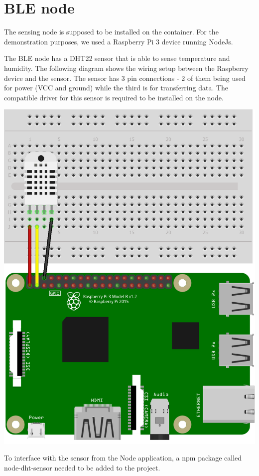 \section {BLE node}
\label {Impl_BLEnodeSection}

The sensing node is supposed to be installed on the container. For the demonstration purposes, we used a Raspberry Pi 3 device running NodeJs.

The BLE node has a DHT22 sensor that is able to sense temperature and humidity. The following diagram shows the wiring setup between the Raspberry device and the sensor. The sensor has 3 pin connections - 2 of them being used for power (VCC and ground) while the third is for transferring data. The compatible driver for this sensor is required to be installed on the node.

\bigskip
\includegraphics[scale=0.7]{gfx/RaspberrySensorNode} 
\bigskip

To interface with the sensor from the Node application, a npm package called node-dht-sensor needed to be added to the project.

